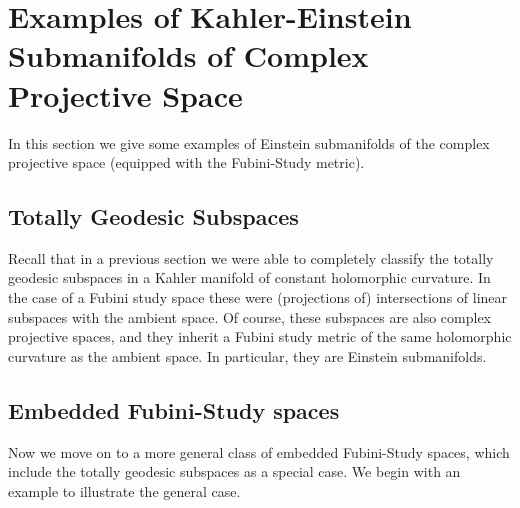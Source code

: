 \documentclass[11pt]{amsart}
\theoremstyle{definition}
\begin{document}
\parskip 6pt
\parindent 0pt
\baselineskip 14pt

\section{ Examples of Kahler-Einstein Submanifolds of Complex Projective Space }

In this section we give some examples of Einstein submanifolds of the complex projective space (equipped with the Fubini-Study metric).

\subsection{ Totally Geodesic Subspaces }

Recall that in a previous section we were able to completely classify the totally geodesic subspaces in a Kahler manifold of constant holomorphic curvature.  In the case of a Fubini study space these were (projections of) intersections of linear subspaces with the ambient space.  Of course, these subspaces are also complex projective spaces, and they inherit a Fubini study metric of the same holomorphic curvature as the ambient space.  In particular, they are Einstein submanifolds. 

\subsection{ Embedded Fubini-Study spaces }

Now we move on to a more general class of embedded Fubini-Study spaces, which include the totally geodesic subspaces as a special case.  We begin with an example to illustrate the general case.
\end{document}
